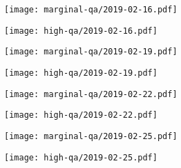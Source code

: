 \documentclass{article}
\begin{document}
\begin{figure}[H]
	\ContinuedFloat
	\centering
	\begin{subfigure}{0.48\linewidth}
		\texttt{[image: marginal-qa/2019-02-16.pdf]}
	\end{subfigure}
	\begin{subfigure}{0.48\linewidth}
		\texttt{[image: high-qa/2019-02-16.pdf]}
	\end{subfigure}
	\begin{subfigure}{0.48\linewidth}
		\texttt{[image: marginal-qa/2019-02-19.pdf]}
	\end{subfigure}
	\begin{subfigure}{0.48\linewidth}
		\texttt{[image: high-qa/2019-02-19.pdf]}
	\end{subfigure}
	\begin{subfigure}{0.48\linewidth}
		\texttt{[image: marginal-qa/2019-02-22.pdf]}
	\end{subfigure}
	\begin{subfigure}{0.48\linewidth}
		\texttt{[image: high-qa/2019-02-22.pdf]}
	\end{subfigure}
	\begin{subfigure}{0.48\linewidth}
		\texttt{[image: marginal-qa/2019-02-25.pdf]}
	\end{subfigure}
	\begin{subfigure}{0.48\linewidth}
		\texttt{[image: high-qa/2019-02-25.pdf]}
	\end{subfigure}
\end{figure}
\end{document}
